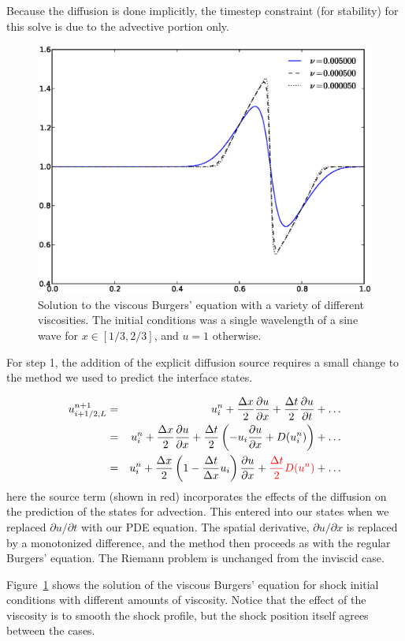 Because the diffusion is done implicitly, the timestep constraint (for
stability) for this solve is due to the advective portion only.

\begin{figure}[t]
\centering
\includegraphics[width=5in]{burgervisc}
\caption[Viscous Burgers' equation solution.]
  {\label{fig:viscburger} Solution to the viscous Burgers' equation
  with a variety of different viscosities.  The initial conditions was
  a single wavelength of a sine wave for $x \in [1/3,2/3]$, and $u = 1$
  otherwise. \\
  }
\end{figure}

For step 1, the addition of the explicit diffusion source requires
a small change to the method we used to predict the interface states.

\begin{eqnarray}
u^{n+1}_{i+1/2,L} &=& u^n_i + \frac{\Delta x}{2} \frac{\partial u}{\partial x}
                        + \frac{\Delta t}{2} \frac{\partial u}{\partial t} + \ldots \\
                &=& u^n_i + \frac{\Delta x}{2} \frac{\partial u}{\partial x}
                        + \frac{\Delta t}{2} \left (-u_i \frac{\partial u}{\partial x} + D(u^n_i) \right ) + \ldots \\
                &=& u^n_i + \frac{\Delta x}{2} \left ( 1 - \frac{\Delta t}{\Delta x}u_i \right ) \frac{\partial u}{\partial x} + {\color{red} \frac{\Delta t}{2} D(u^n) } + \ldots
\end{eqnarray}
here the source term (shown in red) incorporates the effects of the
diffusion on the prediction of the states for advection.  This entered
into our states when we replaced $\partial u/\partial t$ with our PDE
equation.  The spatial derivative, $\partial u/\partial x$ is replaced
by a monotonized difference, and the method then proceeds as with the
regular Burgers' equation.  The Riemann problem is unchanged from the
inviscid case.

Figure~\ref{fig:viscburger} shows the solution of the viscous Burgers'
equation for shock initial conditions with different amounts of
viscosity.  Notice that the effect of the viscosity is to smooth the
shock profile, but the shock position itself agrees between the cases.


